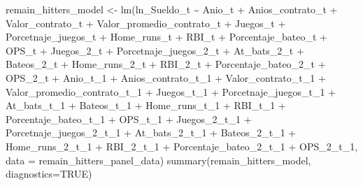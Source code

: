 \documentclass[
]{article}
\newenvironment{Shaded}{\begin{snugshade}}{\end{snugshade}}
\newcommand{\AttributeTok}[1]{\textcolor[rgb]{0.77,0.63,0.00}{#1}}
\newcommand{\ConstantTok}[1]{\textcolor[rgb]{0.00,0.00,0.00}{#1}}
\newcommand{\FunctionTok}[1]{\textcolor[rgb]{0.00,0.00,0.00}{#1}}
\newcommand{\NormalTok}[1]{#1}
\newcommand{\OtherTok}[1]{\textcolor[rgb]{0.56,0.35,0.01}{#1}}
\newcommand{\SpecialCharTok}[1]{\textcolor[rgb]{0.00,0.00,0.00}{#1}}
\begin{document}
\begin{Shaded}
\begin{Highlighting}[]
\NormalTok{remain\_hitters\_model }\OtherTok{\textless{}{-}} \FunctionTok{lm}\NormalTok{(ln\_Sueldo\_t }\SpecialCharTok{\textasciitilde{}}\NormalTok{ Anio\_t }\SpecialCharTok{+}\NormalTok{ Anios\_contrato\_t }\SpecialCharTok{+}\NormalTok{ Valor\_contrato\_t }\SpecialCharTok{+}\NormalTok{ Valor\_promedio\_contrato\_t }\SpecialCharTok{+}\NormalTok{ Juegos\_t }\SpecialCharTok{+}\NormalTok{ Porcetnaje\_juegos\_t}
                                 \SpecialCharTok{+}\NormalTok{ Home\_runs\_t }\SpecialCharTok{+}\NormalTok{ RBI\_t }\SpecialCharTok{+}\NormalTok{ Porcentaje\_bateo\_t }\SpecialCharTok{+}\NormalTok{ OPS\_t }\SpecialCharTok{+}\NormalTok{ Juegos\_2\_t }\SpecialCharTok{+}\NormalTok{ Porcetnaje\_juegos\_2\_t}
                                 \SpecialCharTok{+}\NormalTok{ At\_bats\_2\_t }\SpecialCharTok{+}\NormalTok{ Bateos\_2\_t }\SpecialCharTok{+}\NormalTok{ Home\_runs\_2\_t }\SpecialCharTok{+}\NormalTok{ RBI\_2\_t }\SpecialCharTok{+}\NormalTok{ Porcentaje\_bateo\_2\_t }\SpecialCharTok{+}\NormalTok{ OPS\_2\_t }\SpecialCharTok{+}\NormalTok{ Anio\_t\_1 }\SpecialCharTok{+}\NormalTok{ Anios\_contrato\_t\_1}
                                 \SpecialCharTok{+}\NormalTok{ Valor\_contrato\_t\_1 }\SpecialCharTok{+}\NormalTok{ Valor\_promedio\_contrato\_t\_1 }\SpecialCharTok{+}\NormalTok{ Juegos\_t\_1 }\SpecialCharTok{+}\NormalTok{ Porcetnaje\_juegos\_t\_1 }\SpecialCharTok{+}\NormalTok{ At\_bats\_t\_1 }\SpecialCharTok{+}\NormalTok{ Bateos\_t\_1}
                                 \SpecialCharTok{+}\NormalTok{ Home\_runs\_t\_1 }\SpecialCharTok{+}\NormalTok{ RBI\_t\_1 }\SpecialCharTok{+}\NormalTok{ Porcentaje\_bateo\_t\_1 }\SpecialCharTok{+}\NormalTok{ OPS\_t\_1 }\SpecialCharTok{+}\NormalTok{ Juegos\_2\_t\_1 }\SpecialCharTok{+}\NormalTok{ Porcetnaje\_juegos\_2\_t\_1 }\SpecialCharTok{+}\NormalTok{ At\_bats\_2\_t\_1}
                                 \SpecialCharTok{+}\NormalTok{ Bateos\_2\_t\_1 }\SpecialCharTok{+}\NormalTok{ Home\_runs\_2\_t\_1 }\SpecialCharTok{+}\NormalTok{ RBI\_2\_t\_1 }\SpecialCharTok{+}\NormalTok{ Porcentaje\_bateo\_2\_t\_1 }\SpecialCharTok{+}\NormalTok{ OPS\_2\_t\_1, }\AttributeTok{data =}\NormalTok{ remain\_hitters\_panel\_data)}
\FunctionTok{summary}\NormalTok{(remain\_hitters\_model, }\AttributeTok{diagnostics=}\ConstantTok{TRUE}\NormalTok{)}
\end{Highlighting}
\end{Shaded}
\end{document}
